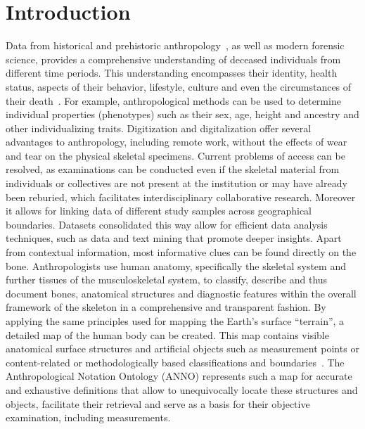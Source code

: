 \documentclass[sw]{iosart2x}
\begin{document}
\section{Introduction}\label{sec:introduction}
Data from historical and prehistoric anthropology~\citep{prehistoricanthropology}, as well as modern forensic science, provides a comprehensive understanding of deceased individuals from different time periods.
This understanding encompasses their identity, health status, aspects of their behavior, lifestyle, culture and even the circumstances of their death~\citep{spurensuche}.
For example, anthropological methods can be used to determine individual properties (phenotypes) such as their sex, age, height and ancestry and other individualizing traits.
%
Digitization and digitalization offer several advantages to anthropology, including remote work, without the effects of wear and tear on the physical skeletal specimens.
Current problems of access can be resolved, as examinations can be conducted even if the skeletal material from individuals or collectives are not present at the institution or may have already been reburied, which facilitates interdisciplinary collaborative research.
Moreover it allows for linking data of different study samples across geographical boundaries.
Datasets consolidated this way allow for efficient data analysis techniques, such as data and text mining that promote deeper insights.
%
Apart from contextual information, most informative clues can be found directly on the bone.
Anthropologists use human anatomy, specifically the skeletal system and further tissues of the musculoskeletal system, to classify, describe and thus document bones, anatomical structures and diagnostic features within the overall framework of the skeleton in a comprehensive and transparent fashion.
%
By applying the same principles used for mapping the Earth's surface \enquote{terrain}, a detailed map of the human body can be created.
This map contains visible anatomical surface structures and artificial objects such as measurement points or content-related or methodologically based classifications and boundaries~\citep{topo}.
The Anthropological Notation Ontology (ANNO) represents such a map for accurate and exhaustive definitions that allow to unequivocally locate these structures and objects, facilitate their retrieval and serve as a basis for their objective examination, including measurements.
\end{document}
